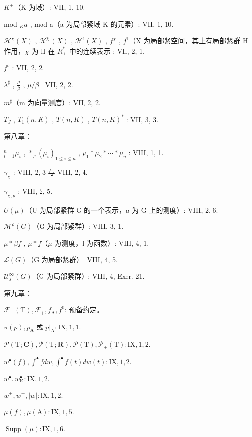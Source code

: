 \(K^{+}\)（K 为域）: VII, 1, 10.

mod \(_{K}a\) , mod a（a 为局部紧域 K 的元素）: VII, 1, 10.

\(\mathcal{H}^{\chi}(X)\) , \(\mathcal{H}_{+}^{\chi}(X)\) , \(\mathcal{H}^{1}(X)\) , \(f^{\chi}\) , \(f^{1}\)（X 为局部紧空间，其上有局部紧群 H 作用，\(\chi\) 为 H 在 \(R_{+}^{*}\) 中的连续表示 : VII, 2, 1.

\(f^{b}\) : VII, 2, 2.

\(\lambda^{\sharp}\) , \(\frac{\mu}{\beta}\) , \(\mu/\beta\) : VII, 2, 2.

\(m^{\sharp}\)（m 为向量测度）: VII, 2, 2.

\(T_{J}\) , \(T_{1}(n,K)\) , \(T(n,K)\) , \(T(n,K)^{*}\) : VII, 3, 3.

第八章：

\(^{n}_{i=1}\mu_{i}\) , \(*_{\varphi}(\mu_{i})_{1\leqslant i\leqslant n}\) , \(\mu_{1}*\mu_{2}*\cdots*\mu_{n}\) : VIII, 1, 1.

\(\gamma_{\chi}\) : VIII, 2, 3 与 VIII, 2, 4.

\(\gamma_{\chi,p}\) : VIII, 2, 5.

\(U(\mu)\)（U 为局部紧群 G 的一个表示，\(\mu\) 为 G 上的测度）: VIII, 2, 6.

\(\mathcal{M}^{\rho}(G)\)（G 为局部紧群）: VIII, 3, 1.

\(\mu*\beta f\) , \(\mu*f\)（\(\mu\) 为测度，f 为函数）: VIII, 4, 1.

\(\mathcal{L}(G)\)（G 为局部紧群）: VIII, 4, 5.

\(\mathcal{U}_{s}^{\infty}(G)\)（G 为局部紧群）: VIII, 4, Exer. 21.

第九章：

\(\mathcal{F}_{+}(\mathrm{T}), \mathcal{F}_{+}, f_{\mathrm{A}}, f^{0}\): 预备约定。

\(\pi(p), p_{\mathrm{A}}\) 或 \(p|_{\mathrm{A}}: \mathrm{IX}, 1, 1\).

\(\mathcal{P}(\mathrm{T}; \mathbf{C}), \mathcal{P}(\mathrm{T}; \mathbf{R}), \mathcal{P}(\mathrm{T}), \mathcal{P}_{+}(\mathrm{T}): \mathrm{IX}, 1, 2\).

\(w^{\bullet}(f), \int^{\bullet} f dw, \int^{\bullet} f(t) dw(t): \mathrm{IX}, 1, 2\).

\(w^{\bullet}, w_{\mathrm{K}}^{\bullet}: \mathrm{IX}, 1, 2\).

\(w^{+}, w^{-}, |w|: \mathrm{IX}, 1, 2\).

\(\mu(f), \mu(\mathrm{A}): \mathrm{IX}, 1, 5\).

\(\operatorname{Supp}(\mu): \mathrm{IX}, 1, 6\).

